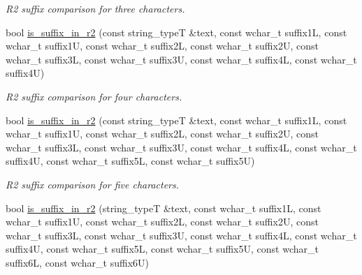 \begin{DoxyCompactItemize}
\begin{DoxyCompactList}\small\item\em R2 suffix comparison for three characters. \end{DoxyCompactList}\item 
\hypertarget{group___stemming_gac12e9f11d41f69e71c7379387c4564b9}{bool \hyperlink{group___stemming_gac12e9f11d41f69e71c7379387c4564b9}{is\-\_\-suffix\-\_\-in\-\_\-r2} (const string\-\_\-type\-T \&text, const wchar\-\_\-t suffix1\-L, const wchar\-\_\-t suffix1\-U, const wchar\-\_\-t suffix2\-L, const wchar\-\_\-t suffix2\-U, const wchar\-\_\-t suffix3\-L, const wchar\-\_\-t suffix3\-U, const wchar\-\_\-t suffix4\-L, const wchar\-\_\-t suffix4\-U)}\label{group___stemming_gac12e9f11d41f69e71c7379387c4564b9}

\begin{DoxyCompactList}\small\item\em R2 suffix comparison for four characters. \end{DoxyCompactList}\item 
\hypertarget{group___stemming_gaca8fba0d6b27d8da969508adc281cfa5}{bool \hyperlink{group___stemming_gaca8fba0d6b27d8da969508adc281cfa5}{is\-\_\-suffix\-\_\-in\-\_\-r2} (const string\-\_\-type\-T \&text, const wchar\-\_\-t suffix1\-L, const wchar\-\_\-t suffix1\-U, const wchar\-\_\-t suffix2\-L, const wchar\-\_\-t suffix2\-U, const wchar\-\_\-t suffix3\-L, const wchar\-\_\-t suffix3\-U, const wchar\-\_\-t suffix4\-L, const wchar\-\_\-t suffix4\-U, const wchar\-\_\-t suffix5\-L, const wchar\-\_\-t suffix5\-U)}\label{group___stemming_gaca8fba0d6b27d8da969508adc281cfa5}

\begin{DoxyCompactList}\small\item\em R2 suffix comparison for five characters. \end{DoxyCompactList}\item 
\hypertarget{group___stemming_gad85a9757083c5fcbd6300367df2a648b}{bool \hyperlink{group___stemming_gad85a9757083c5fcbd6300367df2a648b}{is\-\_\-suffix\-\_\-in\-\_\-r2} (string\-\_\-type\-T \&text, const wchar\-\_\-t suffix1\-L, const wchar\-\_\-t suffix1\-U, const wchar\-\_\-t suffix2\-L, const wchar\-\_\-t suffix2\-U, const wchar\-\_\-t suffix3\-L, const wchar\-\_\-t suffix3\-U, const wchar\-\_\-t suffix4\-L, const wchar\-\_\-t suffix4\-U, const wchar\-\_\-t suffix5\-L, const wchar\-\_\-t suffix5\-U, const wchar\-\_\-t suffix6\-L, const wchar\-\_\-t suffix6\-U)}\label{group___stemming_gad85a9757083c5fcbd6300367df2a648b}


\end{DoxyCompactItemize}
